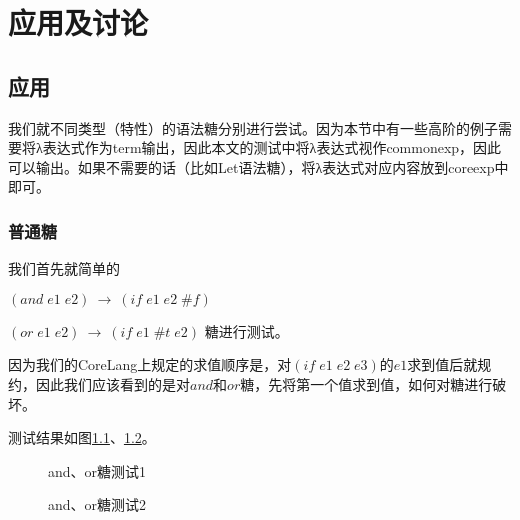 \pagestyle{fancy}
\normalsize
\linespread{1.5}\selectfont
\label{mark:chapter4}\chapter{应用及讨论}



\section{应用}
我们就不同类型（特性）的语法糖分别进行尝试。因为本节中有一些高阶的例子需要将λ表达式作为term输出，因此本文的测试中将λ表达式视作commonexp，因此可以输出。如果不需要的话（比如Let语法糖），将λ表达式对应内容放到coreexp中即可。

\subsection{普通糖}

我们首先就简单的

$(and\;e1\;e2)~→~(if\;e1\;e2\;\#f)$

$(or\;e1\;e2)~→~(if\;e1\;\#t\;e2)$
糖进行测试。

因为我们的CoreLang上规定的求值顺序是，对$(if \;e1\;e2\;e3)$的$e1$求到值后就规约，因此我们应该看到的是对$and$和$or$糖，先将第一个值求到值，如何对糖进行破坏。

测试结果如图\ref{fig:and1}、\ref{fig:and2}。
\begin{figure}[ht]
	\begin{center}
	\end{center}
	\caption{and、or糖测试1}
	\label{fig:and1}
\end{figure}

\begin{figure}[ht]
	\begin{center}
	\end{center}
	\caption{and、or糖测试2}
	\label{fig:and2}
\end{figure}

